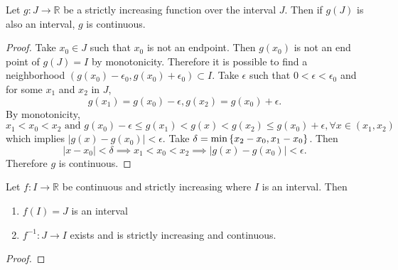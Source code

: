 \documentclass[../notes.tex]{subfiles}
\begin{document}
\begin{theorem}
    Let $g : J \to \mathbb{R}$ be a strictly increasing function over the interval $J$. Then if $g(J)$ is also an interval, $g$ is continuous.
\end{theorem}

\begin{proof}
    Take $x_0 \in J$ such that $x_0$ is not an endpoint. Then $g(x_0)$ is not an end point of $g(J) = I$ by monotonicity. Therefore it is possible to find a neighborhood $(g(x_0) - \epsilon_0, g(x_0) + \epsilon_0) \subset I$. Take $\epsilon$ such that $0 < \epsilon < \epsilon_0$ and for some $x_1$ and $x_2$ in $J$,
    \[
        g(x_1) = g(x_0) - \epsilon, g(x_2) = g(x_0) + \epsilon
    .\]
    By monotonicity,
    \[
        x_1 < x_0 < x_2 \text{ and } g(x_0) - \epsilon \leq g(x_1) < g(x) < g(x_2) \leq g(x_0) + \epsilon, \forall x \in (x_1, x_2)
    \]
    which implies $|g(x) - g(x_0)| < \epsilon$.
    Take $\delta = \min\qty{x_2 - x_0, x_1 - x_0}$. Then
    \[
        |x - x_0| < \delta \implies x_1 < x_0 < x_2 \implies |g(x) - g(x_0)| < \epsilon
    .\]
    Therefore $g$ is continuous.
\end{proof}

\begin{theorem}
    Let $f : I \to \mathbb{R}$ be continuous and strictly increasing where $I$ is an interval. Then
    \begin{enumerate}
        \item $f(I) = J$ is an interval
        \item $f^{-1} : J \to I$ exists and is strictly increasing and continuous. 
    \end{enumerate}
\end{theorem}

\begin{proof}
    
\end{proof}
\end{document}
